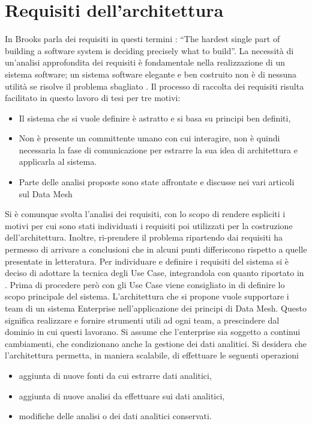\documentclass[12pt]{report}
\begin{document}
\section{Requisiti dell'architettura}\label{requisiti}
In \cite{brooks_no_1987} Brooks parla dei requisiti in questi termini : ``The hardest single part of building a software system is deciding precisely what to build''. 
La necessità di un'analisi approfondita dei requisiti è fondamentale nella realizzazione di un sistema software; un sistema software elegante e ben costruito non è di nessuna utilità se risolve il problema sbagliato \cite{pressman2005software}.
Il processo di raccolta dei requisiti risulta facilitato in questo lavoro di tesi per tre motivi:
\begin{itemize}
    \item Il sistema che si vuole definire è astratto e si basa su principi ben definiti,
    \item Non è presente un committente umano con cui interagire, non è quindi necessaria la fase di comunicazione per estrarre la sua idea di architettura e applicarla al sistema.
    \item Parte delle analisi proposte sono state affrontate e discusse nei vari articoli sul Data Mesh
\end{itemize}
Si è comunque svolta l'analisi dei requisiti, con lo scopo di rendere espliciti i motivi per cui sono stati individuati i requisiti poi utilizzati per la costruzione dell'architettura.
Inoltre, ri-prendere il problema ripartendo dai requisiti ha permesso di arrivare a conclusioni che in alcuni punti differiscono rispetto a quelle presentate in letteratura.
Per individuare e definire i requisiti del sistema si è deciso di adottare la tecnica degli Use Case, integrandola con quanto riportato in \cite{dehghani_data_2022} .
Prima di procedere però con gli Use Case viene consigliato in \cite{cockburn2008writing} di definire lo scopo principale del sistema.
L'architettura che si propone vuole supportare i team di un  sistema Enterprise nell'applicazione dei principi di Data Mesh. 
Questo significa realizzare e fornire strumenti utili ad ogni team, a prescindere dal dominio in cui questi lavorano.
Si assume che l'enterprise sia soggetto a continui cambiamenti, che condizionano anche la gestione dei dati analitici. 
Si desidera che l'architettura permetta, in maniera scalabile, di effettuare le seguenti operazioni
\begin{itemize}
    \item aggiunta di nuove fonti da cui estrarre dati analitici,
    \item aggiunta di nuove analisi da effettuare sui dati analitici,
    \item modifiche delle analisi o dei dati analitici conservati.
\end{itemize}
\end{document}
